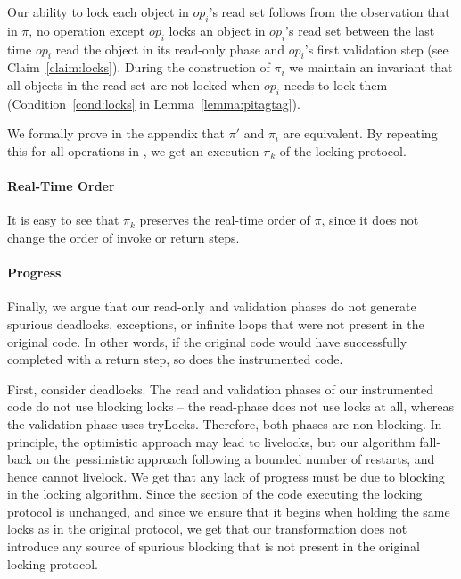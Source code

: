 {Our ability to lock each object in $op_i$'s read set follows from the
observation that in $\pi$, no operation except $op_i$ locks an object in
$op_i$'s read set between the last time $op_i$ read the object in its
read-only phase and $op_i$'s first validation step (see Claim~\ref{claim:locks}). 
During the construction of $\pi_i$ we maintain
an invariant that all objects in the read set are not locked when $op_i$ needs
to lock them (Condition~\ref{cond:locks} in Lemma~\ref{lemma:pitagtag}).


We formally prove in the appendix that $\pi'$ and $\pi_i$ are equivalent. 
By repeating this for all operations in \op, we get an execution $\pi_k$ of the locking protocol.

\paragraph{Real-Time Order}
It is easy to see that $\pi_k$ preserves the real-time order of $\pi$, since it does not change the order of invoke or return steps. 
}

\paragraph{Progress}
Finally, we argue that our read-only and validation phases do not generate spurious deadlocks, exceptions,
or infinite loops that were not present in the original code. In other words, if the original code would have
successfully completed with a return step, so does the instrumented code.

First, consider deadlocks.
The read and validation phases of our instrumented code do not use blocking locks -- the read-phase does not use locks at all, whereas the 
validation phase uses tryLocks. Therefore, both phases are non-blocking. In principle, the optimistic approach may lead to livelocks, but 
our algorithm fall-back on the pessimistic approach following a bounded number of restarts, and hence cannot livelock. We get that any lack
of progress must be due to blocking in the locking algorithm. Since the section of the code executing the locking protocol is unchanged, and
since we ensure that it begins when holding the same locks as in the original protocol, we get that our transformation does not introduce any
source of spurious blocking that is not present in the original locking protocol. 

